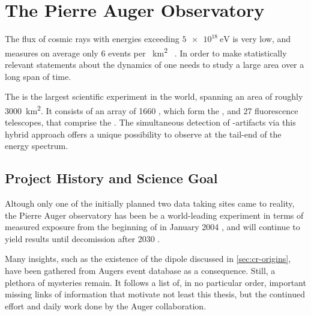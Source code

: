 
\chapter{The Pierre Auger Observatory}
\label{chap:pierre-auger-observatory}

The flux of cosmic rays with energies exceeding $\SI{5e18}{\eV}$ is very low, 
and measures on average only 6 events per \SI{}{\km\squared\year} 
\cite{Fenu2023}. In order to make statistically relevant statements about the 
dynamics of \UHECRs one needs to study a large area over a long span of time.

The \PAO is the largest scientific experiment in the world, spanning an area of
roughly \SI{3000}{\kilo\meter\squared}. It consists of an array of 1660 \WCDs, 
which form the \SD, and 27 fluorescence telescopes, that comprise the \FD. The
simultaneous detection of \CR-artifacts via this hybrid approach offers a unique
possibility to observe \UHECRs at the tail-end of the \CR energy spectrum.


\section{Project History and Science Goal}
\label{sec:science-case}



Altough only one of the initially planned two data taking sites \cite[for PAO 
white paper see][]{Zavrtanik2000} came to reality, the Pierre Auger observatory 
has been be a world-leading experiment in terms of measured exposure from the 
beginning of \DAQ in January 2004 \cite{Abraham2004}, and will continue to yield
results until decomission after 2030 \cite{Castellina2023}.

Many insights, such as the existence of the \CR dipole discussed in
\cref{sec:cr-origins}, have been gathered from Augers event database as a 
consequence. Still, a plethora of mysteries remain. It follows a list of, in no 
particular order, important missing links of information that motivate not least
this thesis, but the continued effort and daily work done by the Auger 
collaboration.

